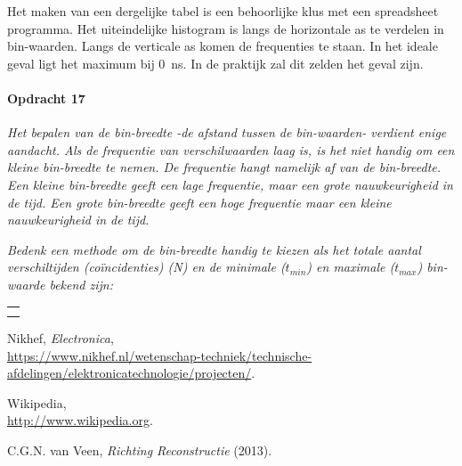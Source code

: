 \bigskip{}

Het maken van een dergelijke tabel is een behoorlijke klus met een
spreadsheet programma. Het uiteindelijke histogram is langs de horizontale
as te verdelen in bin-waarden. Langs de verticale as komen de frequenties
te staan. In het ideale geval ligt het maximum bij \SI{0}{\nano\second}.
In de praktijk zal dit zelden het geval zijn.

\bigskip{}


\begin{minipage}[t]{1\columnwidth}%

\paragraph{Opdracht 17}

\textit{Het bepalen van de bin-breedte -de afstand tussen de bin-waarden-
verdient enige aandacht. Als de frequentie van verschilwaarden laag
is, is het niet handig om een kleine bin-breedte te nemen. De frequentie
hangt namelijk af van de bin-breedte. Een kleine bin-breedte geeft
een lage frequentie, maar een grote nauwkeurigheid in de tijd. Een
grote bin-breedte geeft een hoge frequentie maar een kleine nauwkeurigheid
in de tijd.}

\textit{Bedenk een methode om de bin-breedte handig te kiezen als
het totale aantal verschiltijden (coïncidenties) (N) en de minimale
($t_{min}$) en maximale ($t_{max}$) bin-waarde bekend zijn:}

\begin{tabular}{>{\raggedright}p{16.6cm}}
    \tabularnewline
    \hline 
    \tabularnewline
    \hline 
    \tabularnewline
    \hline 
    \tabularnewline
    \hline 
\end{tabular}%
\end{minipage}


\begin{thebibliography}{9}
     Nikhef, \emph{\hisparc Electronica},\\
    \url{https://www.nikhef.nl/wetenschap-techniek/technische-afdelingen/elektronicatechnologie/projecten/}.

     Wikipedia, \\
    \url{http://www.wikipedia.org}.

     C.G.N. van Veen, \emph{Richting
    Reconstructie} (2013).
\end{thebibliography}


